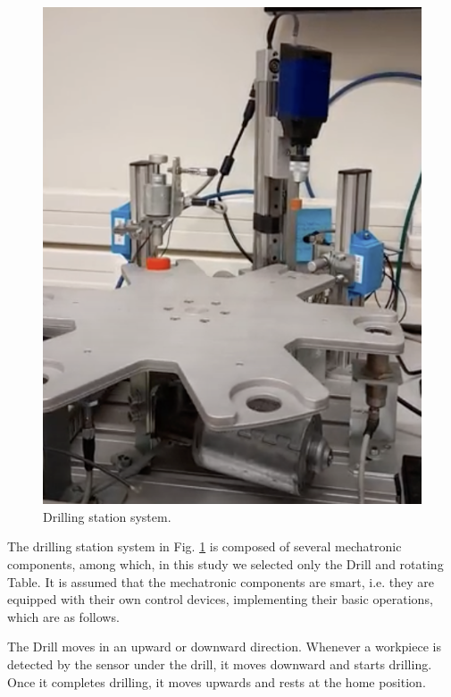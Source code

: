 \documentclass[conference]{IEEEtran}
\begin{document}
\begin{figure}
    \centering
    \includegraphics[scale = 0.2]{images/DT_REAL.png}
    \caption{Drilling station system.}
    \label{figure:RealImageofDrillTable}
\end{figure}


The drilling station system in Fig. \ref{figure:RealImageofDrillTable} is composed of several mechatronic components, among which, in this study we selected only the Drill and rotating Table. 
It is assumed that the mechatronic components are smart, i.e. they are equipped with their own control devices, implementing their basic operations, which are as follows. 

The Drill moves in an upward or downward direction. Whenever a workpiece is detected by the sensor under the drill, it moves downward and starts drilling. Once it completes drilling, it moves upwards and rests at the home position. 
\end{document}
